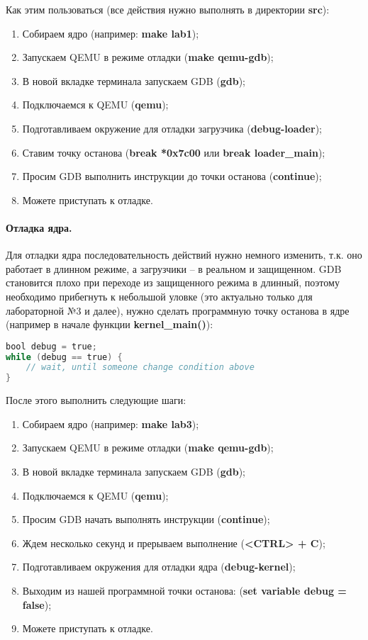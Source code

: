 Как этим пользоваться (все действия нужно выполнять в директории \textbf{src}):
\begin{enumerate}[1.]
\item Собираем ядро (например: \textbf{make lab1});
\item Запускаем QEMU в режиме отладки (\textbf{make qemu-gdb});
\item В новой вкладке терминала запускаем GDB (\textbf{gdb});
\item Подключаемся к QEMU (\textbf{qemu});
\item Подготавливаем окружение для отладки загрузчика (\textbf{debug-loader});
\item Ставим точку останова (\textbf{break *0x7c00} или \textbf{break loader\_main});
\item Просим GDB выполнить инструкции до точки останова (\textbf{continue});
\item Можете приступать к отладке.
\end{enumerate}

\paragraph{Отладка ядра.} Для отладки ядра последовательность действий нужно
немного изменить, т.к. оно работает в длинном режиме, а загрузчики -- в
реальном и защищенном. GDB становится плохо при переходе из защищенного режима
в длинный, поэтому необходимо прибегнуть к небольшой уловке (это актуально
только для лабораторной №3 и далее), нужно сделать программную точку останова
в ядре (например в начале функции \textbf{kernel\_main()}):

\begin{lstlisting}[language=C]
bool debug = true;
while (debug == true) {
	// wait, until someone change condition above
}
\end{lstlisting}

После этого выполнить следующие шаги:
\begin{enumerate}[1.]
\item Собираем ядро (например: \textbf{make lab3});
\item Запускаем QEMU в режиме отладки (\textbf{make qemu-gdb});
\item В новой вкладке терминала запускаем GDB (\textbf{gdb});
\item Подключаемся к QEMU (\textbf{qemu});
\item Просим GDB начать выполнять инструкции (\textbf{continue});
\item Ждем несколько секунд и прерываем выполнение (\textbf{<CTRL> + C});
\item Подготавливаем окружения для отладки ядра (\textbf{debug-kernel});
\item Выходим из нашей программной точки останова: (\textbf{set variable debug = false});
\item Можете приступать к отладке.
\end{enumerate}

